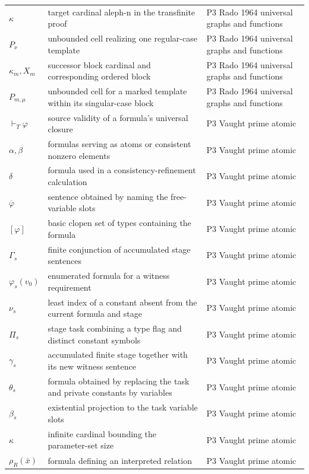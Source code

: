 \begin{longtable}{@{}p{}p{}p{}@{}}
\(\kappa\) & target cardinal aleph-n in the transfinite proof & P3 Rado 1964 universal graphs and functions \\
\(P_\nu\) & unbounded cell realizing one regular-case template & P3 Rado 1964 universal graphs and functions \\
\(\kappa_m,\allowbreak X_m\) & successor block cardinal and corresponding ordered block & P3 Rado 1964 universal graphs and functions \\
\(P_{m,\mu}\) & unbounded cell for a marked template within its singular-case block & P3 Rado 1964 universal graphs and functions \\
\(\vdash_T\varphi\) & source validity of a formula's universal closure & P3 Vaught prime atomic \\
\(\alpha,\allowbreak \beta\) & formulas serving as atoms or consistent nonzero elements & P3 Vaught prime atomic \\
\(\delta\) & formula used in a consistency-refinement calculation & P3 Vaught prime atomic \\
\(\overline\varphi\) & sentence obtained by naming the free-variable slots & P3 Vaught prime atomic \\
\([\varphi]\) & basic clopen set of types containing the formula & P3 Vaught prime atomic \\
\(\Gamma_s\) & finite conjunction of accumulated stage sentences & P3 Vaught prime atomic \\
\(\varphi_s(v_0)\) & enumerated formula for a witness requirement & P3 Vaught prime atomic \\
\(\nu_s\) & least index of a constant absent from the current formula and stage & P3 Vaught prime atomic \\
\(\Pi_s\) & stage task combining a type flag and distinct constant symbols & P3 Vaught prime atomic \\
\(\gamma_s\) & accumulated finite stage together with its new witness sentence & P3 Vaught prime atomic \\
\(\theta_s\) & formula obtained by replacing the task and private constants by variables & P3 Vaught prime atomic \\
\(\beta_s\) & existential projection to the task variable slots & P3 Vaught prime atomic \\
\(\kappa\) & infinite cardinal bounding the parameter-set size & P3 Vaught prime atomic \\
\(\rho_R(\bar x)\) & formula defining an interpreted relation & P3 Vaught prime atomic \\

\end{longtable}

